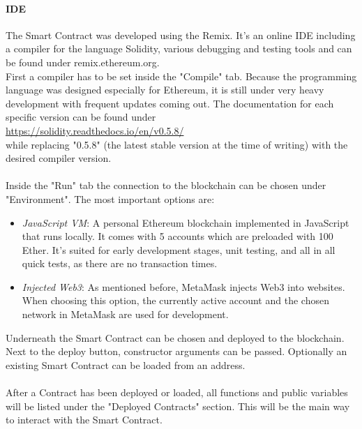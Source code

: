 \paragraph{IDE}
The Smart Contract was developed using the Remix. It’s an online IDE including a compiler for the language Solidity, various debugging and testing tools and can be found under remix.ethereum.org.
\\
First a compiler has to be set inside the "Compile" tab. Because the programming language was designed especially for Ethereum, it is still under very heavy development with frequent updates coming out. The documentation for each specific version can be found under
\\
\url{https://solidity.readthedocs.io/en/v0.5.8/}
\\
while replacing "0.5.8" (the latest stable version at the time of writing) with the desired compiler version.
\\\\
Inside the "Run" tab the connection to the blockchain can be chosen under "Environment". The most important options are:
\begin{itemize}
    \item \textit{JavaScript VM}: A personal Ethereum blockchain implemented in JavaScript that runs locally. It comes with 5 accounts which are preloaded with 100 Ether. It’s suited for early development stages, unit testing, and all in all quick tests, as there are no transaction times.
    \item \textit{Injected Web3}: As mentioned before, MetaMask injects Web3 into websites. When choosing this option, the currently active account and the chosen network in MetaMask are used for development.
\end{itemize}
Underneath the Smart Contract can be chosen and deployed to the blockchain. Next to the deploy button, constructor arguments can be passed. Optionally an existing Smart Contract can be loaded from an address.
\\\\
After a Contract has been deployed or loaded, all functions and public variables will be listed under the "Deployed Contracts" section. This will be the main way to interact with the Smart Contract.

